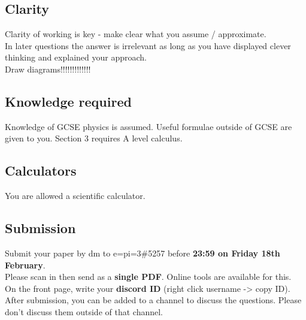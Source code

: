 \documentclass{exam}
\begin{document}
\subsection*{Clarity}
Clarity of working is key - make clear what you assume / approximate.\\
In later questions the answer is irrelevant as long as you have displayed clever thinking and explained your approach.\\
Draw diagrams!!!!!!!!!!!!!

\subsection*{Knowledge required}
Knowledge of GCSE physics is assumed. Useful formulae outside of GCSE are given to you. Section 3 requires A level calculus.

\subsection*{Calculators}
You are allowed a scientific calculator.

\subsection*{Submission}
Submit your paper by dm to
{\selectfont e=pi=3\#5257}
before \textbf{23:59 on Friday 18th February}.\\
Please scan in then send as a \textbf{single PDF}. Online tools are available for this.\\
On the front page, write your \textbf{discord ID} (right click username -> copy ID).\\
After submission, you can be added to a channel to discuss the questions. Please don't discuss them outside of that channel.

\centering

\end{document}
